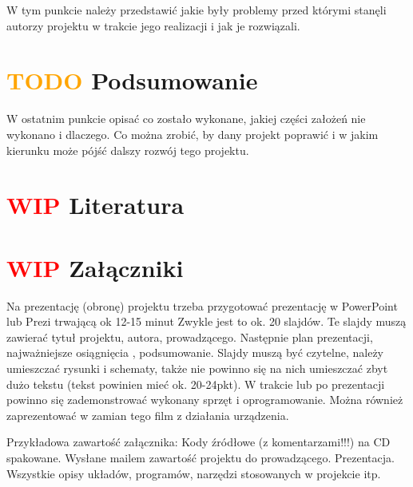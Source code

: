 \documentclass[11pt,titlepage,a4paper]{article}
\begin{document}
W tym punkcie należy przedstawić jakie były problemy przed którymi stanęli autorzy projektu w trakcie jego realizacji i jak je rozwiązali.

\newpage

\section{\textcolor{orange}{TODO} Podsumowanie}

W ostatnim punkcie opisać co zostało wykonane, jakiej części założeń nie wykonano i dlaczego. Co można zrobić, by dany projekt poprawić i w jakim kierunku może pójść dalszy rozwój tego projektu.

\newpage

\section{\textcolor{red}{WIP}  Literatura}

\printbibliography[heading=none]

\newpage

\section{\textcolor{red}{WIP} Załączniki}

Na prezentację (obronę) projektu trzeba przygotować prezentację w PowerPoint lub Prezi trwającą ok 12-15 minut Zwykle jest to ok. 20 slajdów. Te slajdy muszą zawierać tytuł projektu, autora, prowadzącego. Następnie plan prezentacji, najważniejsze osiągnięcia , podsumowanie. Slajdy muszą być czytelne, należy umieszczać rysunki i schematy, także nie powinno się na nich umieszczać zbyt dużo tekstu (tekst powinien mieć ok. 20-24pkt). W trakcie lub po prezentacji powinno się zademonstrować wykonany sprzęt i oprogramowanie. Można również zaprezentować w zamian tego film z działania urządzenia.

Przykładowa zawartość załącznika:
Kody źródłowe (z komentarzami!!!) na CD spakowane.
Wysłane mailem zawartość projektu do prowadzącego.
Prezentacja.
Wszystkie opisy układów, programów, narzędzi stosowanych w projekcie itp.

\newpage

\renewcommand*{\lstlistingname}{Załącznik}
\renewcommand*{\figurename}{Załącznik}
\setcounter{figure}{1}


\end{document}
